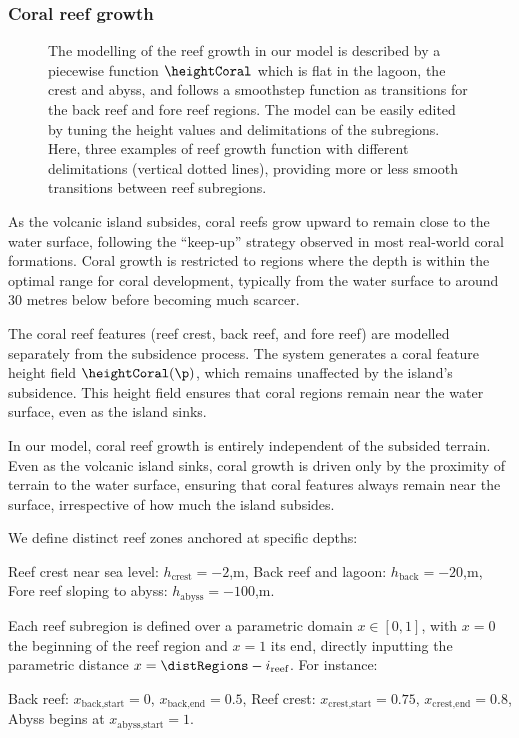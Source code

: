 \subsubsection{Coral reef growth}
\label{sec:coral-island-reef-growth}

\begin{figure}[H]
\caption{The modelling of the reef growth in our model is described by a piecewise function $\heightCoral$ which is flat in the lagoon, the crest and abyss, and follows a smoothstep function as transitions for the back reef and fore reef regions. The model can be easily edited by tuning the height values and delimitations of the subregions. Here, three examples of reef growth function with different delimitations (vertical dotted lines), providing more or less smooth transitions between reef subregions.}
\label{fig:coral-island-reef-function}
\end{figure}

As the volcanic island subsides, coral reefs grow upward to remain close to the water surface, following the “keep-up” strategy observed in most real-world coral formations. Coral growth is restricted to regions where the depth is within the optimal range for coral development, typically from the water surface to around 30 metres below before becoming much scarcer.

The coral reef features (reef crest, back reef, and fore reef) are modelled separately from the subsidence process. The system generates a coral feature height field $\heightCoral(\p)$, which remains unaffected by the island's subsidence. This height field ensures that coral regions remain near the water surface, even as the island sinks.

In our model, coral reef growth is entirely independent of the subsided terrain. Even as the volcanic island sinks, coral growth is driven only by the proximity of terrain to the water surface, ensuring that coral features always remain near the surface, irrespective of how much the island subsides.

We define distinct reef zones anchored at specific depths:
\begin{Itemize}
\Item{} Reef crest near sea level: $h_\text{crest} = -2$,m,
\Item{} Back reef and lagoon: $h_\text{back} = -20$,m,
\Item{} Fore reef sloping to abyss: $h_\text{abyss} = -100$,m.
\end{Itemize}

Each reef subregion is defined over a parametric domain $x \in [0, 1]$, with $x=0$ the beginning of the reef region and $x=1$ its end, directly inputting the parametric distance $x = \distRegions - i_{\text{reef}}$. For instance:
\begin{Itemize}
\Item{} Back reef: $x_{\text{back,start}} = 0$, $x_{\text{back,end}} = 0.5$,
\Item{} Reef crest: $x_{\text{crest,start}} = 0.75$, $x_{\text{crest,end}} = 0.8$,
\Item{} Abyss begins at $x_{\text{abyss,start}} = 1$.
\end{Itemize}

